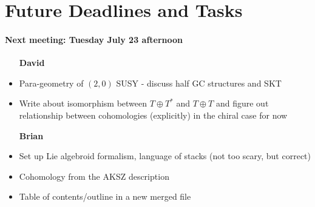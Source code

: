 \documentclass{article}
\newcommand{\TT}{{T\oplus T^*}}
\theoremstyle{definition}
\theoremstyle{definition}
\theoremstyle{remark}
\begin{document}
\section*{Future Deadlines and Tasks}
\paragraph*{Next meeting: Tuesday July 23 afternoon}
\begin{itemize}
\item [\textbf{David}]
\item Para-geometry of $(2,0)$ SUSY - discuss half GC structures and SKT
\item Write about isomorphism between $\TT$ and $T\oplus T$ and figure out relationship between cohomologies (explicitly) in the chiral case for now
\end{itemize}

\begin{itemize}
\item [\textbf{Brian}]
\item Set up Lie algebroid formalism, language of stacks (not too scary, but correct)
\item Cohomology from the AKSZ description
\item Table of contents/outline in a new merged file
\end{itemize}



\end{document}
